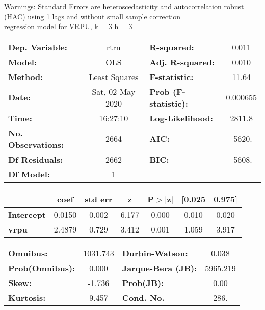 Warnings: \newline
 [1] Standard Errors are heteroscedasticity and autocorrelation robust (HAC) using 1 lags and without small sample correction\\ 

regression model for VRPU, k = 3 h = 3\begin{center}
\begin{tabular}{lclc}
\toprule
\textbf{Dep. Variable:}    &       rtrn       & \textbf{  R-squared:         } &     0.011   \\
\textbf{Model:}            &       OLS        & \textbf{  Adj. R-squared:    } &     0.010   \\
\textbf{Method:}           &  Least Squares   & \textbf{  F-statistic:       } &     11.64   \\
\textbf{Date:}             & Sat, 02 May 2020 & \textbf{  Prob (F-statistic):} &  0.000655   \\
\textbf{Time:}             &     16:27:10     & \textbf{  Log-Likelihood:    } &    2811.8   \\
\textbf{No. Observations:} &        2664      & \textbf{  AIC:               } &    -5620.   \\
\textbf{Df Residuals:}     &        2662      & \textbf{  BIC:               } &    -5608.   \\
\textbf{Df Model:}         &           1      & \textbf{                     } &             \\
\bottomrule
\end{tabular}
\begin{tabular}{lcccccc}
                   & \textbf{coef} & \textbf{std err} & \textbf{z} & \textbf{P$> |$z$|$} & \textbf{[0.025} & \textbf{0.975]}  \\
\midrule
\textbf{Intercept} &       0.0150  &        0.002     &     6.177  &         0.000        &        0.010    &        0.020     \\
\textbf{vrpu}      &       2.4879  &        0.729     &     3.412  &         0.001        &        1.059    &        3.917     \\
\bottomrule
\end{tabular}
\begin{tabular}{lclc}
\textbf{Omnibus:}       & 1031.743 & \textbf{  Durbin-Watson:     } &    0.038  \\
\textbf{Prob(Omnibus):} &   0.000  & \textbf{  Jarque-Bera (JB):  } & 5965.219  \\
\textbf{Skew:}          &  -1.736  & \textbf{  Prob(JB):          } &     0.00  \\
\textbf{Kurtosis:}      &   9.457  & \textbf{  Cond. No.          } &     286.  \\
\bottomrule
\end{tabular}
\end{center}

